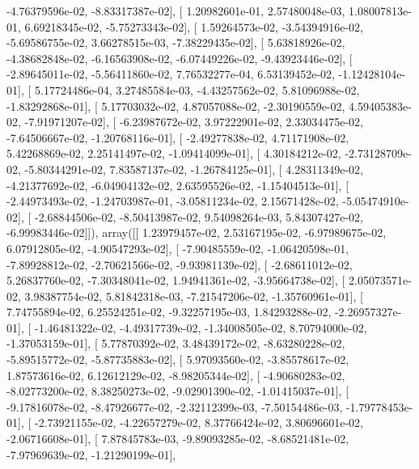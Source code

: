 \documentclass{article}
\begin{document}
         -4.76379596e-02,  -8.83317387e-02],
       [  1.20982601e-01,   2.57480048e-03,   1.08007813e-01,
          6.69218345e-02,  -5.75273343e-02],
       [  1.59264573e-02,  -3.54394916e-02,  -5.69586755e-02,
          3.66278515e-03,  -7.38229435e-02],
       [  5.63818926e-02,  -4.38682848e-02,  -6.16563908e-02,
         -6.07449226e-02,  -9.43923446e-02],
       [ -2.89645011e-02,  -5.56411860e-02,   7.76532277e-04,
          6.53139452e-02,  -1.12428104e-01],
       [  5.17724486e-04,   3.27485584e-03,  -4.43257562e-02,
          5.81096988e-02,  -1.83292868e-01],
       [  5.17703032e-02,   4.87057088e-02,  -2.30190559e-02,
          4.59405383e-02,  -7.91971207e-02],
       [ -6.23987672e-02,   3.97222901e-02,   2.33034475e-02,
         -7.64506667e-02,  -1.20768116e-01],
       [ -2.49277838e-02,   4.71171908e-02,   5.42268869e-02,
          2.25141497e-02,  -1.09414099e-01],
       [  4.30184212e-02,  -2.73128709e-02,  -5.80344291e-02,
          7.83587137e-02,  -1.26784125e-01],
       [  4.28311349e-02,  -4.21377692e-02,  -6.04904132e-02,
          2.63595526e-02,  -1.15404513e-01],
       [ -2.44973493e-02,  -1.24703987e-01,  -3.05811234e-02,
          2.15671428e-02,  -5.05474910e-02],
       [ -2.68844506e-02,  -8.50413987e-02,   9.54098264e-03,
          5.84307427e-02,  -6.99983446e-02]]), array([[  1.23979457e-02,   2.53167195e-02,  -6.97989675e-02,
          6.07912805e-02,  -4.90547293e-02],
       [ -7.90485559e-02,  -1.06420598e-01,  -7.89928812e-02,
         -2.70621566e-02,  -9.93981139e-02],
       [ -2.68611012e-02,   5.26837760e-02,  -7.30348041e-02,
          1.94941361e-02,  -3.95664738e-02],
       [  2.05073571e-02,   3.98387754e-02,   5.81842318e-03,
         -7.21547206e-02,  -1.35760961e-01],
       [  7.74755894e-02,   6.25524251e-02,  -9.32257195e-03,
          1.84293288e-02,  -2.26957327e-01],
       [ -1.46481322e-02,  -4.49317739e-02,  -1.34008505e-02,
          8.70794000e-02,  -1.37053159e-01],
       [  5.77870392e-02,   3.48439172e-02,  -8.63280228e-02,
         -5.89515772e-02,  -5.87735883e-02],
       [  5.97093560e-02,  -3.85578617e-02,   1.87573616e-02,
          6.12612129e-02,  -8.98205344e-02],
       [ -4.90680283e-02,  -8.02773200e-02,   8.38250273e-02,
         -9.02901390e-02,  -1.01415037e-01],
       [ -9.17816078e-02,  -8.47926677e-02,  -2.32112399e-03,
         -7.50154486e-03,  -1.79778453e-01],
       [ -2.73921155e-02,  -4.22657279e-02,   8.37766424e-02,
          3.80696601e-02,  -2.06716608e-01],
       [  7.87845783e-03,  -9.89093285e-02,  -8.68521481e-02,
         -7.97969639e-02,  -1.21290199e-01],
\end{document}
